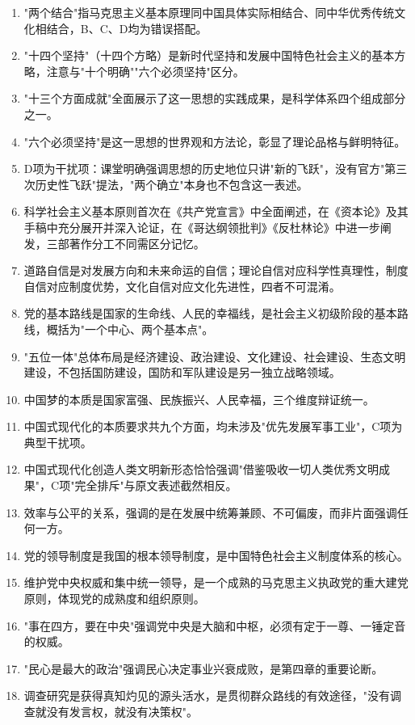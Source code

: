 \documentclass[12pt, a4paper]{article}
\begin{document}
\begin{answerbox}
\begin{enumerate}[itemsep=2pt, topsep=4pt, leftmargin=1.6em]
\item "两个结合"指马克思主义基本原理同中国具体实际相结合、同中华优秀传统文化相结合，B、C、D均为错误搭配。
\item "十四个坚持"（十四个方略）是新时代坚持和发展中国特色社会主义的基本方略，注意与"十个明确""六个必须坚持"区分。
\item "十三个方面成就"全面展示了这一思想的实践成果，是科学体系四个组成部分之一。
\item "六个必须坚持"是这一思想的世界观和方法论，彰显了理论品格与鲜明特征。
\item D项为干扰项：课堂明确强调思想的历史地位只讲"新的飞跃"，没有官方"第三次历史性飞跃"提法，"两个确立"本身也不包含这一表述。
\item 科学社会主义基本原则首次在《共产党宣言》中全面阐述，在《资本论》及其手稿中充分展开并深入论证，在《哥达纲领批判》《反杜林论》中进一步阐发，三部著作分工不同需区分记忆。
\item 道路自信是对发展方向和未来命运的自信；理论自信对应科学性真理性，制度自信对应制度优势，文化自信对应文化先进性，四者不可混淆。
\item 党的基本路线是国家的生命线、人民的幸福线，是社会主义初级阶段的基本路线，概括为"一个中心、两个基本点"。
\item "五位一体"总体布局是经济建设、政治建设、文化建设、社会建设、生态文明建设，不包括国防建设，国防和军队建设是另一独立战略领域。
\item 中国梦的本质是国家富强、民族振兴、人民幸福，三个维度辩证统一。
\item 中国式现代化的本质要求共九个方面，均未涉及"优先发展军事工业"，C项为典型干扰项。
\item 中国式现代化创造人类文明新形态恰恰强调"借鉴吸收一切人类优秀文明成果"，C项"完全排斥"与原文表述截然相反。
\item 效率与公平的关系，强调的是在发展中统筹兼顾、不可偏废，而非片面强调任何一方。
\item 党的领导制度是我国的根本领导制度，是中国特色社会主义制度体系的核心。
\item 维护党中央权威和集中统一领导，是一个成熟的马克思主义执政党的重大建党原则，体现党的成熟度和组织原则。
\item "事在四方，要在中央"强调党中央是大脑和中枢，必须有定于一尊、一锤定音的权威。
\item "民心是最大的政治"强调民心决定事业兴衰成败，是第四章的重要论断。
\item 调查研究是获得真知灼见的源头活水，是贯彻群众路线的有效途径，"没有调查就没有发言权，就没有决策权"。

\end{enumerate}
\end{answerbox}
\end{document}
